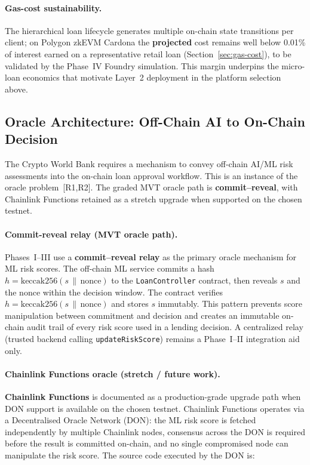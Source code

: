 \documentclass[12pt,a4paper]{report}
\begin{document}
\paragraph{Gas-cost sustainability.}
The hierarchical loan lifecycle generates multiple on-chain state transitions per client; on Polygon zkEVM Cardona the \textbf{projected} cost remains well below 0.01\% of interest earned on a representative retail loan (Section~\ref{sec:gas-cost}), to be validated by the Phase~IV Foundry simulation. This margin underpins the micro-loan economics that motivate Layer~2 deployment in the platform selection above.

\subsection{Oracle Architecture: Off-Chain AI to On-Chain Decision}
\label{sec:oracle-architecture}

The Crypto World Bank requires a mechanism to convey off-chain AI/ML risk assessments into the on-chain loan approval workflow. This is an instance of the oracle problem~[R1,R2]. The graded MVT oracle path is \textbf{commit--reveal}, with Chainlink Functions retained as a stretch upgrade when supported on the chosen testnet.

\paragraph{Commit-reveal relay (MVT oracle path).}
Phases~I--III use a \textbf{commit--reveal relay} as the primary oracle mechanism for ML risk scores. The off-chain ML service commits a hash $h = \text{keccak256}(s \,\|\, \text{nonce})$ to the \texttt{LoanController} contract, then reveals $s$ and the nonce within the decision window. The contract verifies $h = \text{keccak256}(s \,\|\, \text{nonce})$ and stores $s$ immutably. This pattern prevents score manipulation between commitment and decision and creates an immutable on-chain audit trail of every risk score used in a lending decision. A centralized relay (trusted backend calling \texttt{updateRiskScore}) remains a Phase~I--II integration aid only.

\paragraph{Chainlink Functions oracle (stretch / future work).}
\textbf{Chainlink Functions} is documented as a production-grade upgrade path when DON support is available on the chosen testnet. Chainlink Functions operates via a Decentralised Oracle Network (DON): the ML risk score is fetched independently by multiple Chainlink nodes, consensus across the DON is required before the result is committed on-chain, and no single compromised node can manipulate the risk score. The source code executed by the DON is:
\end{document}
